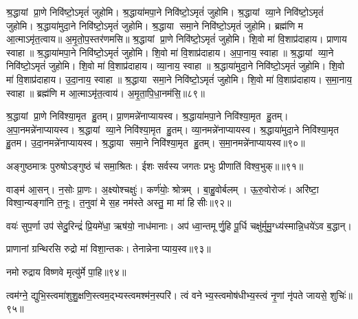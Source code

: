 श्र॒द्धायां प्रा॒णे निवि॑ष्टो॒ऽमृतं॑ जुहोमि। श्र॒द्धाया॑मपा॒ने निवि॑ष्टो॒ऽमृतं॑ जुहोमि। श्र॒द्धायां व्या॒ने निवि॑ष्टो॒ऽमृतं॑ जुहोमि। श्र॒द्धाया॑मुदा॒ने निवि॑ष्टो॒ऽमृतं॑ जुहोमि। श्र॒द्धाया समा॒ने निवि॑ष्टो॒ऽमृतं॑ जुहोमि। ब्रह्म॑णि म आ॒त्माऽमृ॑त॒त्वाय॥ अ॒मृ॒तो॒प॒स्तर॑णमसि॥ श्र॒द्धायां प्रा॒णे निवि॑ष्टो॒ऽमृतं॑ जुहोमि। शि॒वो मा॑ वि॒शाप्र॑दाहाय। प्राणाय स्वाहा॥ श्र॒द्धाया॑मपा॒ने निवि॑ष्टो॒ऽमृतं॑ जुहोमि। शि॒वो मा॑ वि॒शाप्र॑दाहाय। अ॒पा॒नाय॒ स्वाहा॥ श्र॒द्धायां व्या॒ने निवि॑ष्टो॒ऽमृतं॑ जुहोमि। शि॒वो मा॑ वि॒शाप्र॑दाहाय। व्या॒नाय॒ स्वाहा॥ श्र॒द्धाया॑मुदा॒ने निवि॑ष्टो॒ऽमृतं॑ जुहोमि। शि॒वो मा॑ वि॒शाप्र॑दाहाय। उ॒दा॒नाय॒ स्वाहा॥ श्र॒द्धाया समा॒ने निवि॑ष्टो॒ऽमृतं॑ जुहोमि। शि॒वो मा॑ वि॒शाप्र॑दाहाय। स॒मा॒नाय॒ स्वाहा॥ ब्रह्म॑णि म आ॒त्माऽमृ॑त॒त्वाय॑। अ॒मृ॒ता॒पि॒धा॒नम॑सि॒॥८९॥
 \anuvakamend


श्र॒द्धायां प्रा॒णे निवि॑श्या॒मृत हु॒तम्। प्रा॒णमन्ने॑नाप्यायस्व। श्र॒द्धाया॑मपा॒ने निवि॑श्या॒मृत हु॒तम्। अ॒पा॒नमन्ने॑नाप्यायस्व।
श्र॒द्धायां व्या॒ने निवि॑श्या॒मृत हु॒तम्। व्या॒नमन्ने॑नाप्यायस्व। श्र॒द्धाया॑मुदा॒ने निवि॑श्या॒मृत हु॒तम। उ॒दा॒नमन्ने॑नाप्यायस्व।
श्र॒द्धाया समा॒ने निवि॑श्या॒मृत हु॒तम्। स॒मा॒नमन्ने॑नाप्या\-यस्व॥९०॥\anuvakamend

अङ्गुष्ठमात्रः पुरुषोऽङ्गुष्ठं च॑ समा॒श्रितः। ईशः सर्वस्य जगतः प्रभुः प्रीणाति॑ विश्व॒भुक्॥॥९१॥\anuvakamend

वाङ्म॑ आ॒सन्। न॒सोः प्रा॒णः। अ॒क्ष्योश्चक्षुः॑। कर्ण॑योः॒ श्रोत्रम्। बा॒हु॒वोर्बलम्। ऊ॒रु॒वोरोजः॑। अरि॑ष्टा॒ विश्वा॒न्यङ्गा॑नि त॒नूः। त॒नुवा॑ मे स॒ह नम॑स्ते अस्तु॒ मा मा॑ हिसीः॥९२॥
\anuvakamend

वयः॑ सुप॒र्णा उप॑ सेदु॒रिन्द्रं॑ प्रि॒यमे॑धा॒ ऋष॑यो॒ नाध॑मानाः। अप॑ ध्वा॒न्तमूर्णु॒हि पू॒र्धि चक्षु॑र्मुमु॒ग्ध्य॑स्मान्नि॒धये॑ऽव ब॒द्धान्।\anuvakamend

प्राणानां ग्रन्थिरसि रुद्रो मा॑ विशा॒न्तकः। तेनान्नेनाप्या\-य॒स्व॥९३॥ \anuvakamend

नमो रुद्राय विष्णवे मृत्यु॑र्मे पा॒हि॥९४॥ \anuvakamend


त्वम॑ग्ने॒ द्युभि॒स्त्वमा॑शुशु॒क्षणि॒स्त्वम॒द्भ्यस्त्वमश्म॑न॒स्परि॑। त्वं वनेभ्य॒स्त्वमोष॑धीभ्य॒स्त्वं नृ॒णां नृ॑पते जायसे॒ शुचिः॑॥९५॥
\anuvakamend

